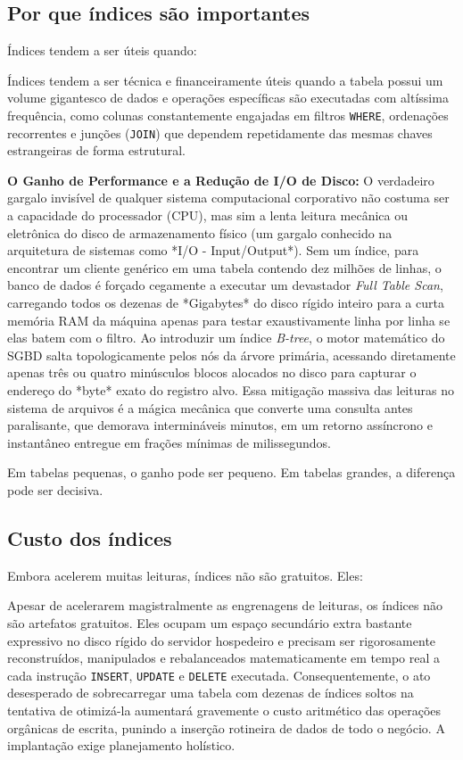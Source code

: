 \subsection{Por que índices são importantes}

Índices tendem a ser úteis quando:

Índices tendem a ser técnica e financeiramente úteis quando a tabela possui um volume gigantesco de dados e operações específicas são executadas com altíssima frequência, como colunas constantemente engajadas em filtros \texttt{WHERE}, ordenações recorrentes e junções (\texttt{JOIN}) que dependem repetidamente das mesmas chaves estrangeiras de forma estrutural.

\textbf{O Ganho de Performance e a Redução de I/O de Disco:} O verdadeiro gargalo invisível de qualquer sistema computacional corporativo não costuma ser a capacidade do processador (CPU), mas sim a lenta leitura mecânica ou eletrônica do disco de armazenamento físico (um gargalo conhecido na arquitetura de sistemas como *I/O - Input/Output*). Sem um índice, para encontrar um cliente genérico em uma tabela contendo dez milhões de linhas, o banco de dados é forçado cegamente a executar um devastador \textit{Full Table Scan}, carregando todos os dezenas de *Gigabytes* do disco rígido inteiro para a curta memória RAM da máquina apenas para testar exaustivamente linha por linha se elas batem com o filtro. Ao introduzir um índice \textit{B-tree}, o motor matemático do SGBD salta topologicamente pelos nós da árvore primária, acessando diretamente apenas três ou quatro minúsculos blocos alocados no disco para capturar o endereço do *byte* exato do registro alvo. Essa mitigação massiva das leituras no sistema de arquivos é a mágica mecânica que converte uma consulta antes paralisante, que demorava intermináveis minutos, em um retorno assíncrono e instantâneo entregue em frações mínimas de milissegundos.

Em tabelas pequenas, o ganho pode ser pequeno. Em tabelas grandes, a diferença pode ser decisiva.

\subsection{Custo dos índices}

Embora acelerem muitas leituras, índices não são gratuitos. Eles:

Apesar de acelerarem magistralmente as engrenagens de leituras, os índices não são artefatos gratuitos. Eles ocupam um espaço secundário extra bastante expressivo no disco rígido do servidor hospedeiro e precisam ser rigorosamente reconstruídos, manipulados e rebalanceados matematicamente em tempo real a cada instrução \texttt{INSERT}, \texttt{UPDATE} e \texttt{DELETE} executada. Consequentemente, o ato desesperado de sobrecarregar uma tabela com dezenas de índices soltos na tentativa de otimizá-la aumentará gravemente o custo aritmético das operações orgânicas de escrita, punindo a inserção rotineira de dados de todo o negócio. A implantação exige planejamento holístico.

